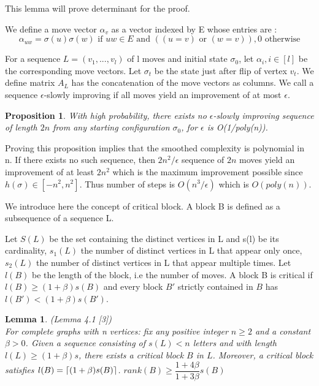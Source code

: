 \documentclass[12pt]{article}
\newtheorem{lemma}[theorem]{Lemma}
\newtheorem{proposition}[theorem]{Proposition}
\DeclarePairedDelimiter{\ceil}{\lceil}{\rceil}
\begin{document}
This lemma will prove determinant for the proof. 

We define a move vector $\alpha_v$ as a vector indexed by E whose entries are :
\begin{equation*}
\alpha_{uw} = \sigma(u)\sigma(w) \text{ if } uw \in E \text{ and }( (u = v) \text{ or } (w = v)), 0 \text{ otherwise}
\end{equation*} 

For a sequence $L = (v_1, ..., v_l)$ of l moves and initial state $\sigma_0$, let $\alpha_i, i \in [l]$ be the corresponding move vectors. Let $\sigma_t$ be the state just after flip of vertex $v_t$. We define matrix $A_L$ has the concatenation of the move vectors as columns. We call a sequence $\epsilon$-slowly improving if all moves yield an improvement of at most $\epsilon$.

\begin{proposition}
\label{prop}
With high probability, there exists no $\epsilon$-slowly improving sequence of length $2n$ from any starting configuration $\sigma_0$, for $\epsilon$ is O(1/poly(n)).
\end{proposition}

Proving this proposition implies that the smoothed complexity is polynomial in n. If there exists no such sequence, then $2n^2/\epsilon$ sequence of $2n$ moves yield an improvement of at least $2n^2$ which is the maximum improvement possible since $h(\sigma) \in [-n^2,n^2]$. Thus number of steps is $O(n^3/\epsilon)$ which is $O(poly(n))$.

We introduce here the concept of critical block. A block B is defined as a subsequence of a sequence L.

Let $S(L)$ be the set containing the distinct vertices in L and s(l) be its cardinality, $s_1(L)$ the number of distinct vertices in L that appear only once, $s_2(L)$ the number of distinct vertices in L that appear multiple times. Let $l(B)$ be the length of the block, i.e the number of moves.
A block B is critical if $l(B) \geq (1 + \beta)s(B)$ and every block $B'$ strictly contained in $B$ has $l(B') < (1+\beta)s(B')$.

\begin{lemma}
\label{critical}
(Lemma 4.1 [3]) \\
For complete graphs with n vertices: fix any positive integer $n \geq 2$ and a constant $\beta > 0$. Given a sequence consisting of $s(L) < n$ letters and with length $l(L) \geq (1 +\beta)s$, there exists a critical block $B$ in $L$. Moreover, a critical block satisfies $l(B) = \ceil{(1 + \beta)s(B)}$.
$rank(B) \geq \dfrac{1+4\beta}{1 + 3\beta}s(B)$
\end{lemma} 
\end{document}
